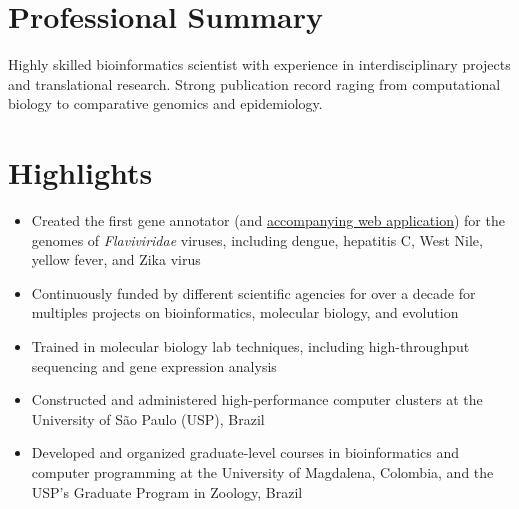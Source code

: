 
\vspace{-2.5em}

\section{Professional Summary}

    Highly skilled bioinformatics scientist with experience in interdisciplinary projects and translational research. Strong publication record raging from computational biology to comparative genomics and epidemiology.

\section{Highlights}

    \begin{itemize}
        \item Created the first gene annotator (and \href{http://flavi-web.com/}{accompanying web application}) for the genomes of \textit{Flaviviridae} viruses, including dengue, hepatitis C, West Nile, yellow fever, and Zika virus
        \item Continuously funded by different scientific agencies for over a decade for multiples projects on bioinformatics, molecular biology, and evolution
        \item Trained in molecular biology lab techniques, including high-throughput sequencing and gene expression analysis
        \item Constructed and administered high-performance computer clusters at the University of São Paulo (USP), Brazil
        \item Developed and organized graduate-level courses in bioinformatics and computer programming at the University of Magdalena, Colombia, and the USP's Graduate Program in Zoology, Brazil
    \end{itemize}
